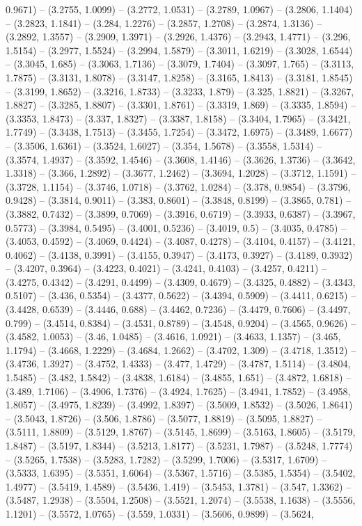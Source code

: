 0.9671) -- (3.2755, 1.0099) -- (3.2772, 1.0531) -- (3.2789, 1.0967) -- (3.2806, 1.1404) -- (3.2823, 1.1841) -- (3.284, 1.2276) -- (3.2857, 1.2708) -- (3.2874, 1.3136) -- (3.2892, 1.3557) -- (3.2909, 1.3971) -- (3.2926, 1.4376) -- (3.2943, 1.4771) -- (3.296, 1.5154) -- (3.2977, 1.5524) -- (3.2994, 1.5879) -- (3.3011, 1.6219) -- (3.3028, 1.6544) -- (3.3045, 1.685) -- (3.3063, 1.7136) -- (3.3079, 1.7404) -- (3.3097, 1.765) -- (3.3113, 1.7875) -- (3.3131, 1.8078) -- (3.3147, 1.8258) -- (3.3165, 1.8413) -- (3.3181, 1.8545) -- (3.3199, 1.8652) -- (3.3216, 1.8733) -- (3.3233, 1.879) -- (3.325, 1.8821) -- (3.3267, 1.8827) -- (3.3285, 1.8807) -- (3.3301, 1.8761) -- (3.3319, 1.869) -- (3.3335, 1.8594) -- (3.3353, 1.8473) -- (3.337, 1.8327) -- (3.3387, 1.8158) -- (3.3404, 1.7965) -- (3.3421, 1.7749) -- (3.3438, 1.7513) -- (3.3455, 1.7254) -- (3.3472, 1.6975) -- (3.3489, 1.6677) -- (3.3506, 1.6361) -- (3.3524, 1.6027) -- (3.354, 1.5678) -- (3.3558, 1.5314) -- (3.3574, 1.4937) -- (3.3592, 1.4546) -- (3.3608, 1.4146) -- (3.3626, 1.3736) -- (3.3642, 1.3318) -- (3.366, 1.2892) -- (3.3677, 1.2462) -- (3.3694, 1.2028) -- (3.3712, 1.1591) -- (3.3728, 1.1154) -- (3.3746, 1.0718) -- (3.3762, 1.0284) -- (3.378, 0.9854) -- (3.3796, 0.9428) -- (3.3814, 0.9011) -- (3.383, 0.8601) -- (3.3848, 0.8199) -- (3.3865, 0.781) -- (3.3882, 0.7432) -- (3.3899, 0.7069) -- (3.3916, 0.6719) -- (3.3933, 0.6387) -- (3.3967, 0.5773) -- (3.3984, 0.5495) -- (3.4001, 0.5236) -- (3.4019, 0.5) -- (3.4035, 0.4785) -- (3.4053, 0.4592) -- (3.4069, 0.4424) -- (3.4087, 0.4278) -- (3.4104, 0.4157) -- (3.4121, 0.4062) -- (3.4138, 0.3991) -- (3.4155, 0.3947) -- (3.4173, 0.3927) -- (3.4189, 0.3932) -- (3.4207, 0.3964) -- (3.4223, 0.4021) -- (3.4241, 0.4103) -- (3.4257, 0.4211) -- (3.4275, 0.4342) -- (3.4291, 0.4499) -- (3.4309, 0.4679) -- (3.4325, 0.4882) -- (3.4343, 0.5107) -- (3.436, 0.5354) -- (3.4377, 0.5622) -- (3.4394, 0.5909) -- (3.4411, 0.6215) -- (3.4428, 0.6539) -- (3.4446, 0.688) -- (3.4462, 0.7236) -- (3.4479, 0.7606) -- (3.4497, 0.799) -- (3.4514, 0.8384) -- (3.4531, 0.8789) -- (3.4548, 0.9204) -- (3.4565, 0.9626) -- (3.4582, 1.0053) -- (3.46, 1.0485) -- (3.4616, 1.0921) -- (3.4633, 1.1357) -- (3.465, 1.1794) -- (3.4668, 1.2229) -- (3.4684, 1.2662) -- (3.4702, 1.309) -- (3.4718, 1.3512) -- (3.4736, 1.3927) -- (3.4752, 1.4333) -- (3.477, 1.4729) -- (3.4787, 1.5114) -- (3.4804, 1.5485) -- (3.482, 1.5842) -- (3.4838, 1.6184) -- (3.4855, 1.651) -- (3.4872, 1.6818) -- (3.489, 1.7106) -- (3.4906, 1.7376) -- (3.4924, 1.7625) -- (3.4941, 1.7852) -- (3.4958, 1.8057) -- (3.4975, 1.8239) -- (3.4992, 1.8397) -- (3.5009, 1.8532) -- (3.5026, 1.8641) -- (3.5043, 1.8726) -- (3.506, 1.8786) -- (3.5077, 1.8819) -- (3.5095, 1.8827) -- (3.5111, 1.8809) -- (3.5129, 1.8767) -- (3.5145, 1.8699) -- (3.5163, 1.8605) -- (3.5179, 1.8487) -- (3.5197, 1.8344) -- (3.5213, 1.8177) -- (3.5231, 1.7987) -- (3.5248, 1.7774) -- (3.5265, 1.7538) -- (3.5283, 1.7282) -- (3.5299, 1.7006) -- (3.5317, 1.6709) -- (3.5333, 1.6395) -- (3.5351, 1.6064) -- (3.5367, 1.5716) -- (3.5385, 1.5354) -- (3.5402, 1.4977) -- (3.5419, 1.4589) -- (3.5436, 1.419) -- (3.5453, 1.3781) -- (3.547, 1.3362) -- (3.5487, 1.2938) -- (3.5504, 1.2508) -- (3.5521, 1.2074) -- (3.5538, 1.1638) -- (3.5556, 1.1201) -- (3.5572, 1.0765) -- (3.559, 1.0331) -- (3.5606, 0.9899) -- (3.5624, 